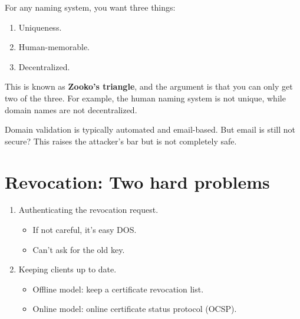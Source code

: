 \documentclass[12pt]{article}
\begin{document}
For any naming system, you want three things:
\begin{enumerate}
\item Uniqueness.
\item Human-memorable.
\item Decentralized.
\end{enumerate}

This is known as \textbf{Zooko's triangle}, and the argument is that you can only get two of the three. For example, the human naming system is not unique, while domain names are not decentralized.

Domain validation is typically automated and email-based. But email is still not secure? This raises the attacker's bar but is not completely safe.

\section*{Revocation: Two hard problems}

\begin{enumerate}
\item Authenticating the revocation request.
\begin{itemize}
\item If not careful, it's easy DOS.
\item Can't ask for the old key.
\end{itemize}
\item Keeping clients up to date.
\begin{itemize}
\item Offline model: keep a certificate revocation list.
\item Online model: online certificate status protocol (OCSP).
\end{itemize}
\end{enumerate}
\end{document}
